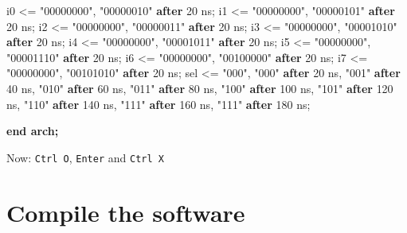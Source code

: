 \documentclass[11pt]{article}
\newenvironment{Shaded}{}{}
\newcommand{\KeywordTok}[1]{\textcolor[rgb]{0.00,0.44,0.13}{\textbf{{#1}}}}
\newcommand{\DataTypeTok}[1]{\textcolor[rgb]{0.56,0.13,0.00}{{#1}}}
\newcommand{\DecValTok}[1]{\textcolor[rgb]{0.25,0.63,0.44}{{#1}}}
\newcommand{\StringTok}[1]{\textcolor[rgb]{0.25,0.44,0.63}{{#1}}}
\newcommand{\OtherTok}[1]{\textcolor[rgb]{0.00,0.44,0.13}{{#1}}}
\newcommand{\ErrorTok}[1]{\textcolor[rgb]{1.00,0.00,0.00}{\textbf{{#1}}}}
\newcommand{\NormalTok}[1]{{#1}}
\begin{document}
\begin{Shaded}
\begin{Highlighting}[]
\NormalTok{    i0 }\OtherTok{\textless{}=} \StringTok{"00000000"}\OtherTok{,} \StringTok{"00000010"} \KeywordTok{after} \DecValTok{20} \DataTypeTok{ns}\NormalTok{;}
\NormalTok{    i1 }\OtherTok{\textless{}=} \StringTok{"00000000"}\OtherTok{,} \StringTok{"00000101"} \KeywordTok{after} \DecValTok{20} \DataTypeTok{ns}\NormalTok{;}
\NormalTok{    i2 }\OtherTok{\textless{}=} \StringTok{"00000000"}\OtherTok{,} \StringTok{"00000011"} \KeywordTok{after} \DecValTok{20} \DataTypeTok{ns}\NormalTok{;}
\NormalTok{    i3 }\OtherTok{\textless{}=} \StringTok{"00000000"}\OtherTok{,} \StringTok{"00001010"} \KeywordTok{after} \DecValTok{20} \DataTypeTok{ns}\NormalTok{;}
\NormalTok{    i4 }\OtherTok{\textless{}=} \StringTok{"00000000"}\OtherTok{,} \StringTok{"00001011"} \KeywordTok{after} \DecValTok{20} \DataTypeTok{ns}\NormalTok{;}
\NormalTok{    i5 }\OtherTok{\textless{}=} \StringTok{"00000000"}\OtherTok{,} \StringTok{"00001110"} \KeywordTok{after} \DecValTok{20} \DataTypeTok{ns}\NormalTok{;}
\NormalTok{    i6 }\OtherTok{\textless{}=} \StringTok{"00000000"}\OtherTok{,} \StringTok{"00100000"} \KeywordTok{after} \DecValTok{20} \DataTypeTok{ns}\NormalTok{;}
\NormalTok{    i7 }\OtherTok{\textless{}=} \StringTok{"00000000"}\OtherTok{,} \StringTok{"00101010"} \KeywordTok{after} \DecValTok{20} \DataTypeTok{ns}\NormalTok{;}
\NormalTok{    sel }\OtherTok{\textless{}=}  \StringTok{"000"}\OtherTok{,}
            \StringTok{"000"} \KeywordTok{after} \DecValTok{20} \DataTypeTok{ns}\OtherTok{,}
            \StringTok{"001"} \KeywordTok{after} \DecValTok{40} \DataTypeTok{ns}\OtherTok{,}
            \StringTok{"010"} \KeywordTok{after} \DecValTok{60} \DataTypeTok{ns}\OtherTok{,}
            \StringTok{"011"} \KeywordTok{after} \DecValTok{80} \DataTypeTok{ns}\OtherTok{,}
            \StringTok{"100"} \KeywordTok{after} \DecValTok{100} \DataTypeTok{ns}\OtherTok{,}
            \StringTok{"101"} \KeywordTok{after} \DecValTok{120} \DataTypeTok{ns}\OtherTok{,}
            \StringTok{"110"} \KeywordTok{after} \DecValTok{140} \DataTypeTok{ns}\OtherTok{,}
            \StringTok{"111"} \KeywordTok{after} \DecValTok{160} \DataTypeTok{ns}\OtherTok{,}
            \StringTok{"111"} \KeywordTok{after} \DecValTok{180} \DataTypeTok{ns}\NormalTok{;}

\ErrorTok{end arch;}
\end{Highlighting}
\end{Shaded}

Now: \texttt{Ctrl\ O}, \texttt{Enter} and \texttt{Ctrl\ X}

    \hypertarget{compile-the-software}{%
\section{Compile the software}\label{compile-the-software}}
\end{document}
